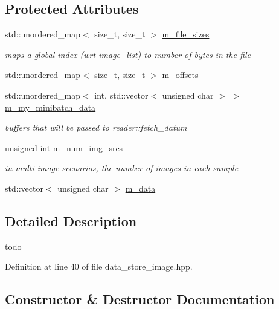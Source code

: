 \subsection*{Protected Attributes}
\begin{DoxyCompactItemize}
\item 
std\+::unordered\+\_\+map$<$ size\+\_\+t, size\+\_\+t $>$ \hyperlink{classlbann_1_1data__store__image_a1903176a4b305fd42617ea1cb6d997ae}{m\+\_\+file\+\_\+sizes}
\begin{DoxyCompactList}\small\item\em maps a global index (wrt image\+\_\+list) to number of bytes in the file \end{DoxyCompactList}\item 
std\+::unordered\+\_\+map$<$ size\+\_\+t, size\+\_\+t $>$ \hyperlink{classlbann_1_1data__store__image_ae5a9ba5fb1bf4d3147743012b8099038}{m\+\_\+offsets}
\item 
std\+::unordered\+\_\+map$<$ int, std\+::vector$<$ unsigned char $>$ $>$ \hyperlink{classlbann_1_1data__store__image_a627a08479de191dcef74e633c4cded8c}{m\+\_\+my\+\_\+minibatch\+\_\+data}
\begin{DoxyCompactList}\small\item\em buffers that will be passed to reader\+::fetch\+\_\+datum \end{DoxyCompactList}\item 
unsigned int \hyperlink{classlbann_1_1data__store__image_a2f660053e7621a9cc70a7c4eef53c9cc}{m\+\_\+num\+\_\+img\+\_\+srcs}
\begin{DoxyCompactList}\small\item\em in multi-\/image scenarios, the number of images in each sample \end{DoxyCompactList}\item 
std\+::vector$<$ unsigned char $>$ \hyperlink{classlbann_1_1data__store__image_a10e9aa0c240785bc0a961f24e87a1c16}{m\+\_\+data}
\end{DoxyCompactItemize}


\subsection{Detailed Description}
todo 

Definition at line 40 of file data\+\_\+store\+\_\+image.\+hpp.



\subsection{Constructor \& Destructor Documentation}
\mbox{\label{classlbann_1_1data__store__image_a8fd8c5546f405a964511823aed8ac986}} 
